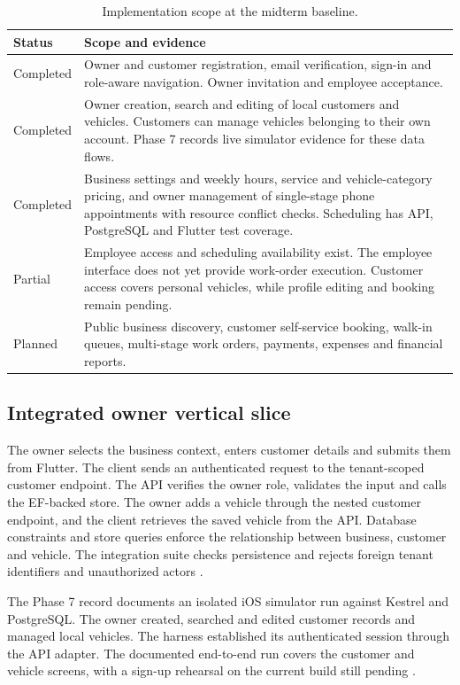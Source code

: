 \documentclass[12pt]{report}
\begin{document}
\begin{table}[htbp]
\centering
\small
\begin{tabular}{@{}p{.22\linewidth}p{.70\linewidth}@{}}
\toprule
Status & Scope and evidence \\
\midrule
Completed & Owner and customer registration, email verification, sign-in and role-aware navigation. Owner invitation and employee acceptance. \\
Completed & Owner creation, search and editing of local customers and vehicles. Customers can manage vehicles belonging to their own account. Phase 7 records live simulator evidence for these data flows. \\
Completed & Business settings and weekly hours, service and vehicle-category pricing, and owner management of single-stage phone appointments with resource conflict checks. Scheduling has API, PostgreSQL and Flutter test coverage. \\
Partial & Employee access and scheduling availability exist. The employee interface does not yet provide work-order execution. Customer access covers personal vehicles, while profile editing and booking remain pending. \\
Planned & Public business discovery, customer self-service booking, walk-in queues, multi-stage work orders, payments, expenses and financial reports. \\
\bottomrule
\end{tabular}
\caption{Implementation scope at the midterm baseline.}
\label{tab:scope}
\end{table}

\subsection{Integrated owner vertical slice}
The owner selects the business context, enters customer details and submits them from Flutter. The client sends an authenticated request to the tenant-scoped customer endpoint. The API verifies the owner role, validates the input and calls the EF-backed store. The owner adds a vehicle through the nested customer endpoint, and the client retrieves the saved vehicle from the API. Database constraints and store queries enforce the relationship between business, customer and vehicle. The integration suite checks persistence and rejects foreign tenant identifiers and unauthorized actors \cite{repo,phase7}.

The Phase 7 record documents an isolated iOS simulator run against Kestrel and PostgreSQL. The owner created, searched and edited customer records and managed local vehicles. The harness established its authenticated session through the API adapter. The documented end-to-end run covers the customer and vehicle screens, with a sign-up rehearsal on the current build still pending \cite{phase7}.
\end{document}
